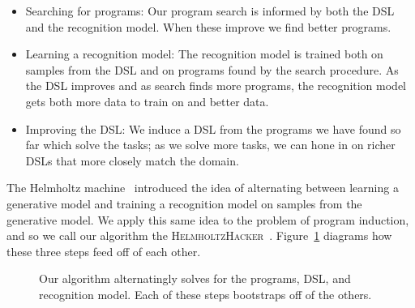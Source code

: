 \documentclass{article}
\newcommand{\system}{\textsc{HelmholtzHacker}~}
\begin{document}
\begin{itemize}
\item Searching for programs: Our program search  is informed by both the DSL and the recognition model.
When these improve we find better programs.
  \item Learning a recognition model: The recognition model is trained both on samples from the DSL and on programs found by the search procedure. As the DSL improves and as search finds more programs, the recognition model gets both more data to train on and better data.
  \item Improving the DSL: We induce a DSL from the programs we have found so far which solve the tasks;
  as we solve more tasks, we can hone in on richer DSLs that more closely match the domain.
\end{itemize}

The Helmholtz machine~\cite{dayan1995helmholtz} introduced the idea of alternating between
learning a generative model and training a recognition model on samples from the generative model.
We apply this same idea to the problem of program induction,
and so we call our algorithm the \system.
Figure~\ref{feeding} diagrams how these three steps feed off of each other.
\begin{figure}\centering
\caption{Our algorithm alternatingly solves for the programs, DSL, and recognition model. Each of these steps bootstraps off of the others.}  \label{feeding}
  \end{figure}
\end{document}

